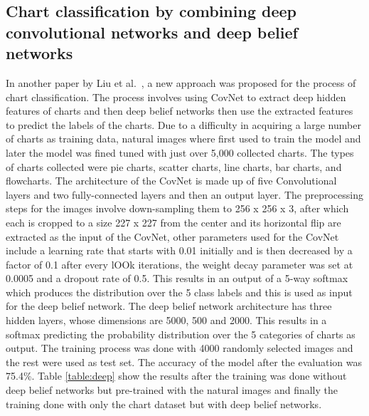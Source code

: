 \documentclass[12pt, a4paper,oneside]{report}
\begin{document}
\subsection{Chart classification by combining deep convolutional networks and deep belief networks}
In another paper by Liu et al.~\cite{liu2015chart}, a new approach was proposed for the process of chart classification. The process involves using CovNet to extract deep hidden features of charts and then deep belief networks then use the extracted features to predict the labels of the charts. Due to a difficulty in acquiring a large number of charts as training data, natural images where first used to train the model and later the model was fined tuned with just over 5,000 collected charts. The types of charts collected were pie charts, scatter charts, line charts, bar charts, and flowcharts. The architecture of the CovNet is made up of five Convolutional layers and two fully-connected layers and then an output layer. The preprocessing steps for the images involve down-sampling them to 256 x 256 x 3, after which each is cropped to a size 227 x 227 from the center and its horizontal flip are extracted as the input of the CovNet, other parameters used for the CovNet include a learning rate that starts with 0.01 initially and is then decreased by a factor of 0.1 after every lOOk iterations, the weight decay parameter was set at 0.0005 and a dropout rate of 0.5. This results in an output of a 5-way softmax which produces the distribution over the 5 class labels and this is used as input for the deep belief network. The deep belief network architecture has three hidden layers, whose dimensions are 5000, 500 and 2000. This results in a softmax predicting the probability
distribution over the 5 categories of charts as output.
The training process was done with 4000 randomly selected images and the rest were used as test set. The accuracy of the model after the evaluation was  75.4\%. Table \ref{table:deep} show the results after the training was done without deep belief networks but pre-trained with the natural images and finally the training done with only the chart dataset but with deep belief networks.
\end{document}
